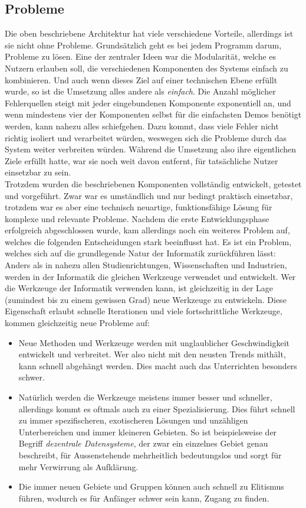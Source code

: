 \documentclass[a4paper,11pt,titlepage,twoside]{memoir}
\begin{document}
\subsection{Probleme}
\label{sec:org28a83f4}
Die oben beschriebene Architektur hat viele verschiedene Vorteile,
allerdings ist sie nicht ohne Probleme. Grundsätzlich geht es bei
jedem Programm darum, Probleme zu lösen. Eine der zentraler Ideen war
die Modularität, welche es Nutzern erlauben soll, die verschiedenen
Komponenten des Systems einfach zu kombinieren. Und auch wenn dieses
Ziel auf einer technischen Ebene erfüllt wurde, so ist die Umsetzung
alles andere als \emph{einfach}. Die Anzahl möglicher Fehlerquellen steigt
mit jeder eingebundenen Komponente exponentiell an, und wenn
mindestens vier der Komponenten selbst für die einfachsten Demos
benötigt werden, kann nahezu alles schiefgehen. Dazu kommt, dass viele
Fehler nicht richtig isoliert und verarbeitet würden, weswegen sich
die Probleme durch das System weiter verbreiten würden. Während die
Umsetzung also ihre eigentlichen Ziele erfüllt hatte, war sie noch
weit davon entfernt, für tatsächliche Nutzer einsetzbar zu sein.\\

\noindent Trotzdem wurden die beschriebenen Komponenten vollständig
entwickelt, getestet und vorgeführt. Zwar war es umständlich und nur
bedingt praktisch einsetzbar, trotzdem war es aber eine technisch
neuartige, funktionsfähige Lösung für komplexe und relevante Probleme.
Nachdem die erste Entwicklungsphase erfolgreich abgeschlossen wurde,
kam allerdings noch ein weiteres Problem auf, welches die folgenden
Entscheidungen stark beeinflusst hat. Es ist ein Problem, welches sich
auf die grundlegende Natur der Informatik zurückführen lässt:\\
Anders als in nahezu allen Studienrichtungen, Wissenschaften und
Industrien, werden in der Informatik die gleichen Werkzeuge verwendet
und entwickelt. Wer die Werkzeuge der Informatik verwenden kann, ist
gleichzeitig in der Lage (zumindest bis zu einem gewissen Grad) neue
Werkzeuge zu entwickeln. Diese Eigenschaft erlaubt schnelle
Iterationen und viele fortschrittliche Werkzeuge, kommen gleichzeitig
neue Probleme auf:
\begin{itemize}
\item Neue Methoden und Werkzeuge werden mit unglaublicher Geschwindigkeit
entwickelt und verbreitet. Wer also nicht mit den neusten Trends
mithält, kann schnell abgehängt werden. Dies macht auch das
Unterrichten besonders schwer.
\item Natürlich werden die Werkzeuge meistens immer besser und schneller,
allerdings kommt es oftmals auch zu einer Spezialisierung. Dies
führt schnell zu immer spezifischeren, exotischeren Lösungen und
unzähligen Unterbereichen und immer kleineren Gebieten. So ist
beispielsweise der Begriff \emph{dezentrale Datensysteme}, der zwar ein
einzelnes Gebiet genau beschreibt, für Aussenstehende mehrheitlich
bedeutungslos und sorgt für mehr Verwirrung als Aufklärung.
\item Die immer neuen Gebiete und Gruppen können auch schnell zu Elitismus
führen, wodurch es für Anfänger schwer sein kann, Zugang zu finden.
\end{itemize}
\end{document}
